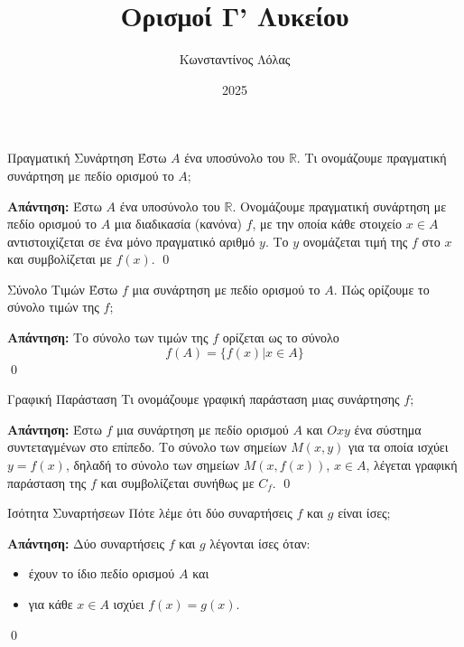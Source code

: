 \documentclass[a4paper, 12pt]{article}
\title{Ορισμοί Γ' Λυκείου}
\author{Κωνσταντίνος Λόλας}
\date{2025}
\renewenvironment{proof}[1][\textbf{Απάντηση}]{%
  \par\noindent\textbf{#1:} \rmfamily}{\qed\par}
\begin{document}
\pagestyle{fancy}
\fancyhead{} %
\fancyfoot{} %

\maketitle

\begin{theorem}{Πραγματική Συνάρτηση}
  Έστω $Α$ ένα υποσύνολο του $\mathbb{R}$. Τι ονομάζουμε πραγματική συνάρτηση με πεδίο ορισμού το $Α$;
\end{theorem}
\begin{proof}
  Έστω $Α$ ένα υποσύνολο του $\mathbb{R}$. Ονομάζουμε πραγματική συνάρτηση με πεδίο ορισμού το $Α$ μια διαδικασία (κανόνα) $f$, με την οποία κάθε στοιχείο $x\in Α$ αντιστοιχίζεται σε ένα μόνο πραγματικό αριθμό $y$. Το $y$ ονομάζεται τιμή της $f$ στο $x$ και συμβολίζεται με $f(x)$.
\end{proof}

\begin{theorem}{Σύνολο Τιμών}
  Έστω $f$ μια συνάρτηση με πεδίο ορισμού το $A$. Πώς ορίζουμε το σύνολο τιμών της $f$;
\end{theorem}
\begin{proof}
  Το σύνολο των τιμών της $f$ ορίζεται ως το σύνολο
  $$f(A) = \{ f(x) | x \in A \}$$
\end{proof}

\begin{theorem}{Γραφική Παράσταση}
  Τι ονομάζουμε γραφική παράσταση μιας συνάρτησης $f$;
\end{theorem}
\begin{proof}
  Έστω $f$ μια συνάρτηση με πεδίο ορισμού $Α$ και $Oxy$ ένα σύστημα συντεταγμένων στο επίπεδο. Το σύνολο των σημείων $M(x, y)$ για τα οποία ισχύει $y = f(x)$, δηλαδή το σύνολο των σημείων $M(x, f(x))$, $x \in A$, λέγεται γραφική παράσταση της $f$ και συμβολίζεται συνήθως με $C_f$.
\end{proof}

\begin{theorem}{Ισότητα Συναρτήσεων}
  Πότε λέμε ότι δύο συναρτήσεις $f$ και $g$ είναι ίσες;
\end{theorem}
\begin{proof}
  Δύο συναρτήσεις $f$ και $g$ λέγονται ίσες όταν:
  \begin{itemize}
    \item έχουν το ίδιο πεδίο ορισμού $Α$ και
    \item για κάθε $x \in A$ ισχύει $f(x) = g(x)$.
  \end{itemize}
\end{proof}
\end{document}
